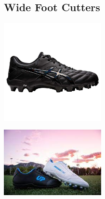 \documentclass{article}
\begin{document}
\begin{answerbox}
\begin{multicols}{3}
    \subsection*{Wide Foot Cutters}
    \centering
        \begin{minipage}{0.3\textwidth}
            \centering
            \includegraphics[width=0.4\textwidth]{cleat2.png}
        \end{minipage}
        \begin{minipage}{0.3\textwidth}
            \centering
            \includegraphics[width=0.4\textwidth]{cleat3.png}
        \end{minipage}

\end{multicols}
\end{answerbox}
\end{document}
